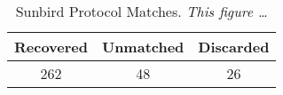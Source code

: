 {\protect
   \begin{table}[t]
   \centering
\footnotesize
      \begin{tabular}{|c|c|c|}
         \hline
         {Recovered} & {Unmatched}  & {Discarded}  \\
         \hline
         \hline
         {262}  & {48} & {26} \\
         \hline
      \end{tabular}
      \caption {Sunbird Protocol Matches. 
\it This figure \dots
}
      \label{tab:sunbird}
\shortline
   \end{table}
}

